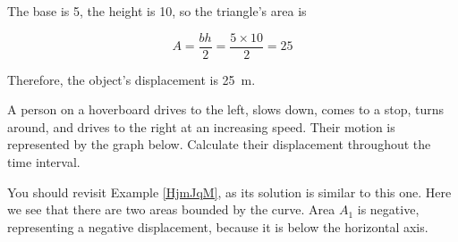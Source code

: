 \documentclass[main.tex]{subfiles}
\begin{document}
\begin{center}
\end{center}

The base is 5, the height is 10, so the triangle's area is

\begin{equation*}
    A = \frac{bh}{2} = \frac{5 \times 10}{2} = 25
\end{equation*}

Therefore, the object's displacement is \SI{25}{m}.

\begin{example} \label{BksbmH}
    A person on a hoverboard drives to the left, slows down, comes to a stop, turns around, and drives to the right at an increasing speed. Their motion is represented by the graph below. Calculate their displacement throughout the time interval.
\end{example}

\begin{center}
\end{center}

\Solution You should revisit Example \ref{HjmJqM}, as its solution is similar to this one. Here we see that there are two areas bounded by the curve. Area $A_1$ is negative, representing a negative displacement, because it is below the horizontal axis.  
\end{document}
